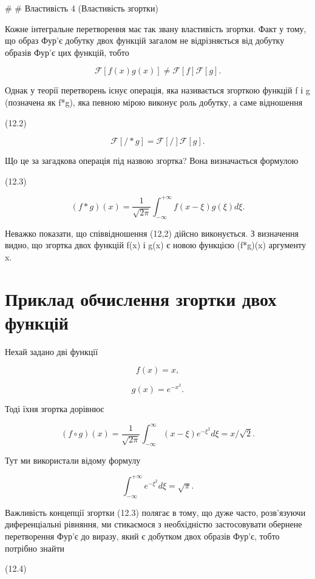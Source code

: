 \documentclass[
  ukrainian,
]{article}
\begin{document}
\# \# Властивість 4 (Властивість згортки)

Кожне інтегральне перетворення має так звану властивість згортки. Факт у
тому, що образ Фур'є добутку двох функцій загалом не відрізняється від
добутку образів Фур'є цих функцій, тобто

\[
\mathcal{F}[f(x)g(x)] \neq \mathcal{F}[f]\mathcal{F}[g].
\]

Однак у теорії перетворень існує операція, яка називається згорткою
функцій f і g (позначена як f*g), яка певною мірою виконує роль добутку,
а саме відношення

(12.2)

\[
\mathcal{F}[/*g] = \mathcal{F}[/]\mathcal{F}[g].
\]

Що це за загадкова операція під назвою згортка? Вона визначається
формулою

(12.3)

\[
(f*g)(x) = \frac{1}{\sqrt{2\pi}} \int_{-\infty}^{+\infty} f(x-\xi) g(\xi) d\xi.
\]

Неважко показати, що співвідношення (12,2) дійсно виконується. З
визначення видно, що згортка двох функцій f(x) і g(x) є новою функцією
(f*g)(x) аргументу x.

\section{Приклад обчислення згортки двох
функцій}\label{ux43fux440ux438ux43aux43bux430ux434-ux43eux431ux447ux438ux441ux43bux435ux43dux43dux44f-ux437ux433ux43eux440ux442ux43aux438-ux434ux432ux43eux445-ux444ux443ux43dux43aux446ux456ux439}

Нехай задано дві функції

\[
f(x) = x,
\]

\[
g(x) = e^{-x^2}.
\]

Тоді їхня згортка дорівнює

\[
(f \circ g)(x) = \frac{1}{\sqrt{2\pi}} \int_{-\infty}^{\infty} (x - \xi) e^{-\xi^2} d\xi = x/\sqrt{2}.
\]

Тут ми використали відому формулу

\[
\int_{-\infty}^{+\infty} e^{-\xi^2} d\xi = \sqrt{\pi}.
\]

Важливість концепції згортки (12.3) полягає в тому, що дуже часто,
розв'язуючи диференціальні рівняння, ми стикаємося з необхідністю
застосовувати обернене перетворення Фур'є до виразу, який є добутком
двох образів Фур'є, тобто потрібно знайти

(12.4)
\end{document}
